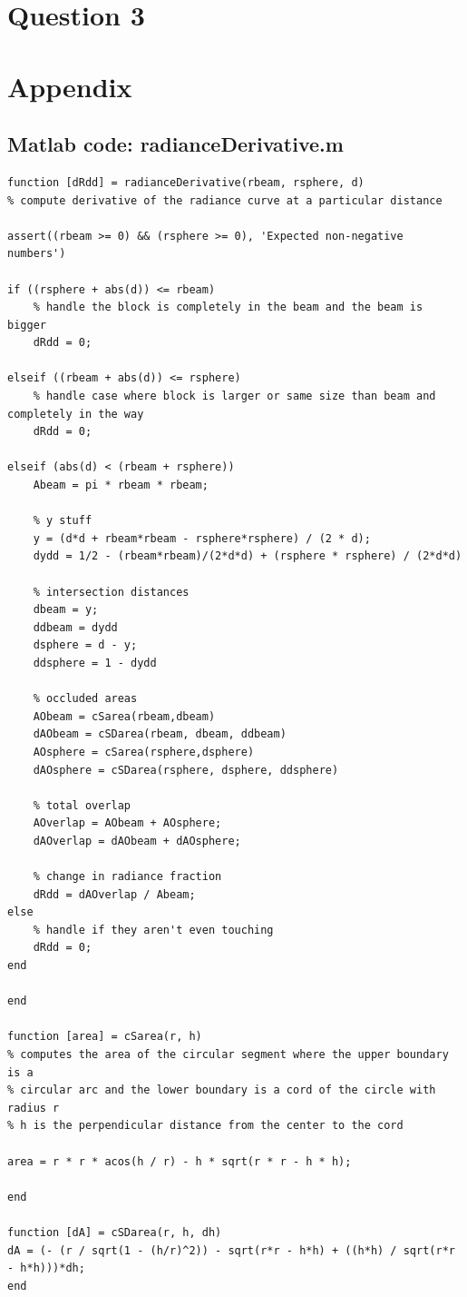\documentclass{article}
\theoremstyle{plain}
\theoremstyle{definition}
\theoremstyle{remark}
\begin{document}
\section*{Question 3}

\newpage
\section*{Appendix}
\subsection*{Matlab code: radianceDerivative.m}
\begin{verbatim}
function [dRdd] = radianceDerivative(rbeam, rsphere, d)
% compute derivative of the radiance curve at a particular distance

assert((rbeam >= 0) && (rsphere >= 0), 'Expected non-negative numbers')

if ((rsphere + abs(d)) <= rbeam)
    % handle the block is completely in the beam and the beam is bigger
    dRdd = 0;
    
elseif ((rbeam + abs(d)) <= rsphere)
    % handle case where block is larger or same size than beam and completely in the way
    dRdd = 0;
    
elseif (abs(d) < (rbeam + rsphere))
    Abeam = pi * rbeam * rbeam;
    
    % y stuff
    y = (d*d + rbeam*rbeam - rsphere*rsphere) / (2 * d);
    dydd = 1/2 - (rbeam*rbeam)/(2*d*d) + (rsphere * rsphere) / (2*d*d)
    
    % intersection distances
    dbeam = y;
    ddbeam = dydd
    dsphere = d - y;
    ddsphere = 1 - dydd
    
    % occluded areas
    AObeam = cSarea(rbeam,dbeam)
    dAObeam = cSDarea(rbeam, dbeam, ddbeam)
    AOsphere = cSarea(rsphere,dsphere)
    dAOsphere = cSDarea(rsphere, dsphere, ddsphere)
    
    % total overlap
    AOverlap = AObeam + AOsphere;
    dAOverlap = dAObeam + dAOsphere;
    
    % change in radiance fraction
    dRdd = dAOverlap / Abeam;
else
    % handle if they aren't even touching
    dRdd = 0;
end

end

function [area] = cSarea(r, h) 
% computes the area of the circular segment where the upper boundary is a
% circular arc and the lower boundary is a cord of the circle with radius r
% h is the perpendicular distance from the center to the cord

area = r * r * acos(h / r) - h * sqrt(r * r - h * h);

end

function [dA] = cSDarea(r, h, dh)
dA = (- (r / sqrt(1 - (h/r)^2)) - sqrt(r*r - h*h) + ((h*h) / sqrt(r*r - h*h)))*dh;
end
\end{verbatim}
\end{document}
